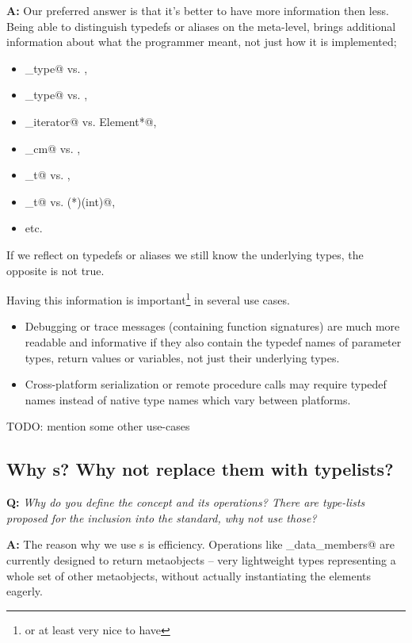 \textbf{A:} Our preferred answer is that it's better to have more information
then less. Being able to distinguish typedefs or aliases on the meta-level,
brings additional information about what the programmer meant, not just how
it is implemented;
\begin{itemize}
	\item \verb@size_type@ vs. \verb@unsigned@,
	\item \verb@rank_type@ vs. \verb@short@,
	\item \verb@const_iterator@ vs. \verb@const Element*@,
	\item \verb@height_cm@ vs. \verb@float@,
	\item \verb@pid_t@ vs. \verb@int@,
	\item \verb@sighandler_t@ vs. \verb@void (*)(int)@,
	\item etc.
\end{itemize}

If we reflect on typedefs or aliases we still know the underlying types,
the opposite is not true.  

Having this information is important\footnote{or at least very nice to have}
in several use cases.

\begin{itemize}
	\item Debugging or trace messages (containing function signatures)
		are much more readable and informative if they also contain 
		the typedef names of parameter types, return values or variables,
		not just their underlying types.
	\item Cross-platform serialization or remote procedure calls may require
		typedef names instead of native type names which vary between
		platforms.
\end{itemize}

TODO: mention some other use-cases

\subsection{Why s? Why not replace them with typelists?}

\textbf{Q:} {\em Why do you define the  concept and its
operations? There are type-lists proposed for the inclusion into the standard,
why not use those?}

\textbf{A:} The reason why we use s is efficiency.
Operations like \verb@get_data_members@ are currently designed to return
metaobjects --  very lightweight types representing a whole set of
other metaobjects, without actually instantiating the elements eagerly.

